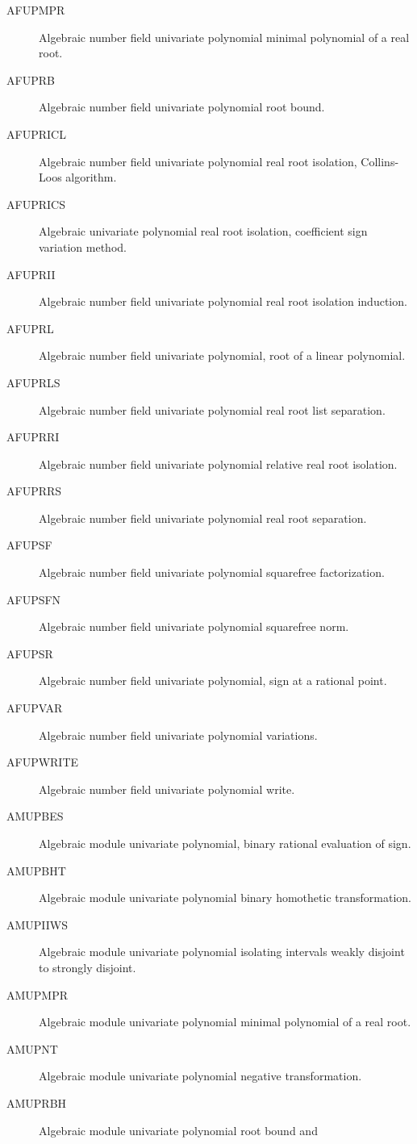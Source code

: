 \begin{description}
\begin{description}
  \item[AFUPMPR]  Algebraic number field univariate polynomial minimal
    polynomial of a real root.
  \item[AFUPRB]  Algebraic number field univariate polynomial root bound.
  \item[AFUPRICL]  Algebraic number field univariate polynomial real root
    isolation, Collins-Loos algorithm.
  \item[AFUPRICS]  Algebraic univariate polynomial real root isolation,
    coefficient sign variation method.
  \item[AFUPRII]  Algebraic number field univariate polynomial real root
    isolation induction.
  \item[AFUPRL]  Algebraic number field univariate polynomial, root of a
    linear polynomial.
  \item[AFUPRLS]  Algebraic number field univariate polynomial real root list
    separation.
  \item[AFUPRRI]  Algebraic number field univariate polynomial relative real
    root isolation.
  \item[AFUPRRS]  Algebraic number field univariate polynomial real root
    separation.
  \item[AFUPSF]  Algebraic number field univariate polynomial squarefree
    factorization.
  \item[AFUPSFN]  Algebraic number field univariate polynomial squarefree
    norm.
  \item[AFUPSR]  Algebraic number field univariate polynomial, sign at a
    rational point.
  \item[AFUPVAR]  Algebraic number field univariate polynomial variations.
  \item[AFUPWRITE]  Algebraic number field univariate polynomial write.
  \item[AMUPBES]  Algebraic module univariate polynomial, binary rational
    evaluation of sign.
  \item[AMUPBHT]  Algebraic module univariate polynomial binary homothetic
    transformation.
  \item[AMUPIIWS]  Algebraic module univariate polynomial isolating intervals
    weakly disjoint to strongly disjoint.
  \item[AMUPMPR]  Algebraic module univariate polynomial minimal polynomial of
    a real root.
  \item[AMUPNT]  Algebraic module univariate polynomial negative
    transformation.
  \item[AMUPRBH]  Algebraic module univariate polynomial root bound and

\end{description}
\end{description}
